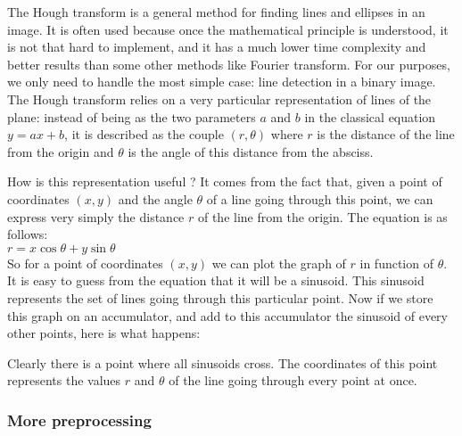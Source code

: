 The Hough transform is a general method for finding lines and ellipses in an
image. It is often used because once the mathematical principle is understood,
it is not that hard to implement, and it has a much lower time complexity and
better results than some other methods like Fourier transform. For our purposes,
we only need to handle the most simple case: line detection in a binary image.\\

The Hough transform relies on a very particular representation of lines of the
plane: instead of being as the two parameters $a$ and $b$ in the classical
equation $y = ax + b$, it is described as the couple $(r, \theta)$ where $r$ is
the distance of the line from the origin and $\theta$ is the angle of this
distance from the absciss.\\

\begin{center}
\end{center}

How is this representation useful ? It comes from the fact that, given a point
of coordinates $(x, y)$ and the angle $\theta$ of a line going through this
point, we can express very simply the distance $r$ of the line from the origin.
The equation is as follows:\\

$r = x\cos\theta + y\sin\theta$\\

So for a point of coordinates $(x, y)$ we can plot the graph of $r$ in function
of $\theta$. It is easy to guess from the equation that it will be a sinusoid.
This sinusoid represents the set of lines going through this particular point.
Now if we store this graph on an accumulator, and add to this accumulator the
sinusoid of every other points, here is what happens:\\

\begin{center}
\end{center}

Clearly there is a point where all sinusoids cross. The coordinates of this
point represents the values $r$ and $\theta$ of the line going through every
point at once.

\subsubsection{More preprocessing}

